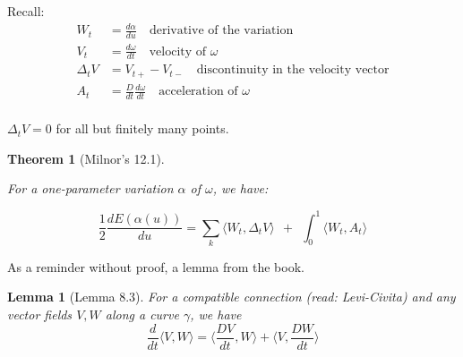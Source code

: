 \documentclass{article}
\newtheorem{thm}{Theorem}
\newtheorem*{lemm*}{Lemma}
\newcommand{\angle}[1]{\langle #1 \rangle}
\begin{document}
Recall:
\[
    \begin{align*}
        W_t &= \frac{d\alpha}{du} \quad\text{derivative of the variation} \\
        V_t &= \frac{d\omega}{dt} \quad\text{velocity of $\omega$} \\
        \Delta_tV &= V_{t+} - V_{t-} \quad\text{discontinuity in the velocity vector} \\
        A_t &= \frac{D}{dt} \frac{d\omega}{dt} \quad\text{acceleration of $\omega$} \\
    \end{align*}
\]

$\Delta_tV = 0$ for all but finitely many points.


\begin{thm}[Milnor's 12.1]
    \label{thm:12.1}

    For a one-parameter variation $\alpha$ of $\omega$, we have:

    \[
        \frac{1}{2} \frac{dE(\alpha(u))}{du} =
        \sum_{k} \angle{ W_t, \Delta_tV } \ \ + \ \ \int_0^1 \angle{ W_t, A_t }
    \]

\end{thm}

As a reminder without proof, a lemma from the book.

\begin{lemm*}[Lemma 8.3]
    For a compatible connection (read: Levi-Civita) and any vector fields $V,W$ along a curve
    $\gamma$, we have
    \[
        \frac{d}{dt}\langle V, W \rangle   =
        \langle \frac{DV}{dt}, W \rangle + \langle V, \frac{DW}{dt} \rangle
    \]
\end{lemm*}
\end{document}
